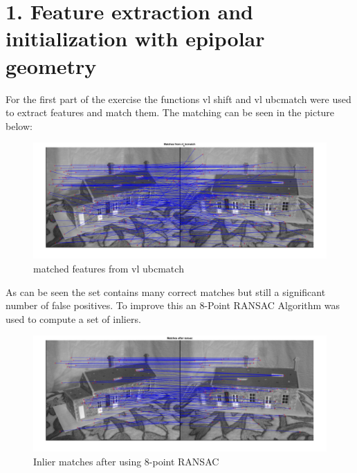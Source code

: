 \documentclass[12pt]{article}
\begin{document}
\maketitle


\section{1. Feature extraction and initialization with epipolar geometry }

For the first part of the exercise the functions vl shift and vl ubcmatch were used to extract features and match them. 
The matching can be seen in the picture below:

\vspace{5mm}
\begin{figure}[H]
	\centering
	\includegraphics[width=1.1\textwidth]{1.jpg}
	\caption{matched features from vl ubcmatch}
	\label{fig1}
\end{figure}
\vspace{5mm}

As can be seen the set contains many correct matches but still a significant number of false positives. To improve this an 8-Point RANSAC Algorithm was used to compute a set of inliers. 


\vspace{5mm}
\begin{figure}[H]
	\centering
	\includegraphics[width=1.1\textwidth]{2.jpg}
	\caption{Inlier matches after using 8-point RANSAC}
	\label{fig1}
\end{figure}
\vspace{5mm}
\end{document}
